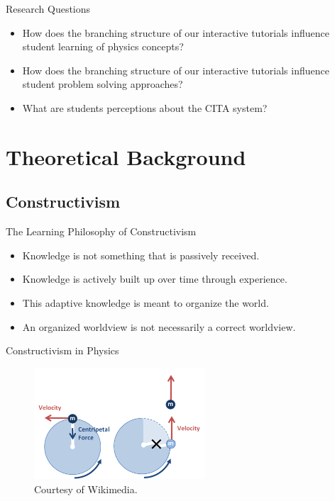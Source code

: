 \documentclass{beamer}
\begin{document}
\begin{frame}{Research Questions}
  \begin{itemize}
  \item How does the branching structure of our interactive tutorials influence student learning of physics concepts?
  \item How does the branching structure of our interactive tutorials influence student problem solving approaches?
  \item What are students perceptions about the CITA system?
  \end{itemize}
\end{frame}

\section{Theoretical Background}

\subsection*{Constructivism}

\begin{frame}{The Learning Philosophy of Constructivism}
\begin{itemize}
\item Knowledge is not something that is passively received.
\item Knowledge is actively built up over time through experience.
\item This adaptive knowledge is meant to organize the world.
\item An organized worldview is not necessarily a correct worldview.
\end{itemize}
\end{frame}

\begin{frame}{Constructivism in Physics}
  \begin{figure}
  \centering
    \includegraphics[width=2.5in]{img/presentation/ucm_string}
    \caption{Courtesy of Wikimedia.}
  \end{figure}
\end{frame}
\end{document}

